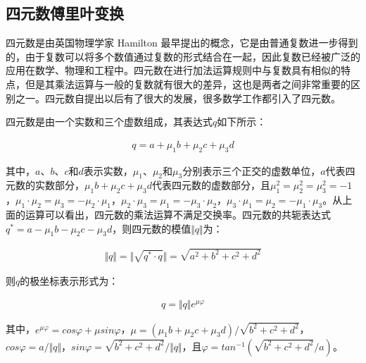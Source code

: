 \subsection{四元数傅里叶变换}
\label{2_2_4}

四元数是由英国物理学家 Hamilton 最早提出的概念\cite{Hamilton1866book}，它是由普通复数进一步得到的，由于复数可以将多个数值通过复数的形式结合在一起，因此复数已经被广泛的应用在数学、物理和工程中。四元数在进行加法运算规则中与复数具有相似的特点，但是其乘法运算与一般的复数就有很大的差异，这也是两者之间非常重要的区别之一。四元数自提出以后有了很大的发展，很多数学工作都引入了四元数\cite{Kantor1989book}。

四元数是由一个实数和三个虚数组成，其表达式$q$如下所示：
\begin{linenomath}
\begin{align}
q=a+\mu_{1}b+\mu_{2}c+\mu_{3}d
\label{式2_28}
\end{align}
\end{linenomath}
其中，$a$、$b$、$c$和$d$表示实数，$\mu_{1}$、$\mu_{2}$和$\mu_{3}$分别表示三个正交的虚数单位，$a$代表四元数的实数部分，$\mu_{1}b+\mu_{2}c+\mu_{3}d$代表四元数的虚数部分，且$\mu_{1}^{2}=\mu_{2}^{2}=\mu_{3}^{2}=-1$，$\mu_{1}\cdot\mu_{2}=\mu_{3}=-\mu_{2}\cdot\mu_{1}$，$\mu_{2}\cdot\mu_{3}=\mu_{1}=-\mu_{3}\cdot\mu_{2}$，$\mu_{3}\cdot\mu_{1}=\mu_{2}=-\mu_{1}\cdot\mu_{3}$。从上面的运算可以看出，四元数的乘法运算不满足交换率。四元数的共轭表达式$q^{*}=a-\mu_{1}b-\mu_{2}c-\mu_{3}d$，则四元数的模值$\Vert q \Vert$为：
\begin{linenomath}
\begin{align}
\Vert q \Vert=\Vert \sqrt{q^{*}\cdot q} \Vert=\sqrt{a^{2}+b^{2}+c^{2}+d^{2}}
\label{式2_29}
\end{align}
\end{linenomath}
则$q$的极坐标表示形式为：
\begin{linenomath}
\begin{align}
q=\Vert q \Vert e^{\mu \varphi}
\label{式2_30}
\end{align}
\end{linenomath}
其中，$e^{\mu \varphi}=cos\varphi+\mu sin\varphi$，$\mu=(\mu_{1}b+\mu_{2}c+\mu_{3}d)/\sqrt{b^{2}+c^{2}+d^{2}}$，$cos\varphi=a/\Vert q \Vert$，$sin\varphi=\sqrt{b^{2}+c^{2}+d^{2}}/\Vert q \Vert$，且$\varphi=tan^{-1}(\sqrt{b^{2}+c^{2}+d^{2}}/a)$。

